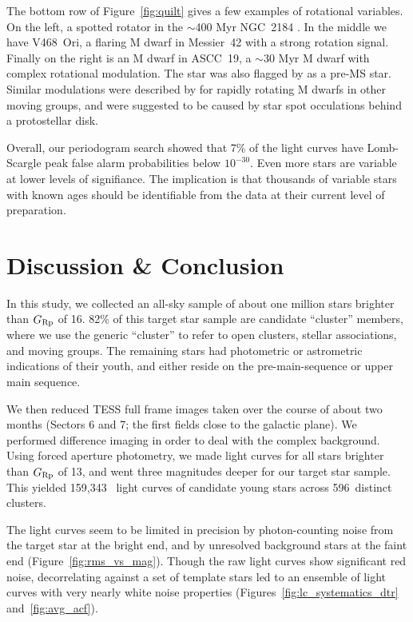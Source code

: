 \documentclass[12pt,twocolumn,tighten]{aastex62}
\newcommand{\numberlcs}{159{,}343\ } %
\newcommand{\numberclusters}{596\ } %
\begin{document}
The bottom row of Figure~\ref{fig:quilt} gives a few examples of
rotational variables.  On the left, a spotted rotator in the
$\sim$400 Myr NGC~2184 \citep{cantat-gaudin_gaia_2018}.  In the
middle we have V468~Ori, a flaring M dwarf in Messier~42 with a strong
rotation signal.
Finally on the right is an M dwarf in ASCC~19, a $\sim$30 Myr M dwarf
with complex rotational modulation.
The star was also flagged by \citet{zari_3d_2018} as a pre-MS star.
Similar modulations were described by \citet{zhan_complex_2019} for
rapidly rotating M dwarfs in other moving groups, and were suggested
to be caused by star spot occulations behind a protostellar disk.

Overall, our periodogram search showed that 7\% of the light curves
have Lomb-Scargle peak false alarm probabilities below $10^{-30}$.
Even more stars are variable at lower levels of signifiance.  The
implication is that thousands of variable stars with known ages should
be identifiable from the data at their current level of preparation.




\section{Discussion \& Conclusion}
\label{sec:conclusion}

In this study, we collected an all-sky sample of about one million
stars brighter than $G_{\rm Rp}$ of 16.  82\% of this target star
sample are candidate ``cluster'' members, where we use the generic
``cluster'' to refer to open clusters, stellar associations, and
moving groups.  The remaining stars had photometric or astrometric
indications of their youth, and either reside on the pre-main-sequence
or upper main sequence.

We then reduced TESS full frame images taken over the course of about
two months (Sectors 6 and 7; the first fields close to the galactic
plane).  We performed difference imaging in order to deal with the
complex background.  Using forced aperture photometry, we made light
curves for all stars brighter than $G_{\rm Rp}$ of 13, and went three
magnitudes deeper for our target star sample.  This yielded \numberlcs
light curves of candidate young stars across \numberclusters distinct
clusters.

The light curves seem to be limited in precision by photon-counting
noise from the target star at the bright end, and by unresolved
background stars at the faint end (Figure~\ref{fig:rms_vs_mag}).
Though the raw light curves show significant red noise, decorrelating
against a set of template stars led to an ensemble of light curves
with very nearly white noise properties
(Figures~\ref{fig:lc_systematics_dtr} and~\ref{fig:avg_acf}).
\end{document}
